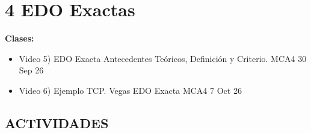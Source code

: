 \section{4 EDO Exactas}

\begin{tcolorbox}[enunciado]
\textbf{Clases:}
\begin{itemize}[leftmargin=*]
    \item Video 5) EDO Exacta Antecedentes Teóricos, Definición y Criterio. MCA4 30 Sep 26
    \item Video 6) Ejemplo TCP. Vegas EDO Exacta MCA4 7 Oct 26
\end{itemize}
\end{tcolorbox}

\subsection*{ACTIVIDADES}

